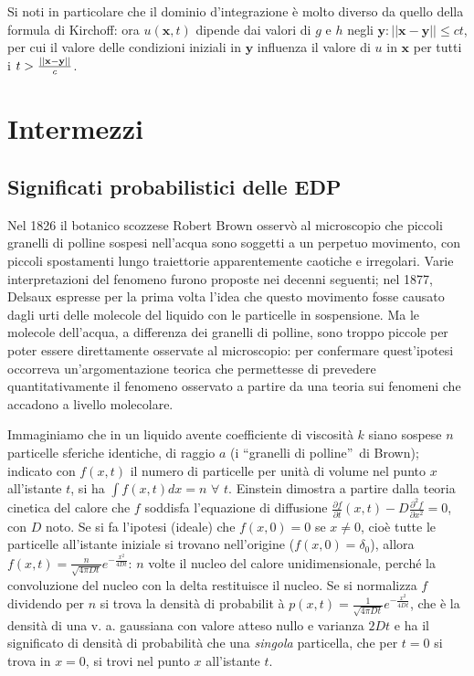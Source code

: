 \documentclass{article}
\begin{document}
Si noti in particolare che il dominio d'integrazione \`{e} molto diverso da
quello della formula di Kirchoff: ora $u\left( \mathbf{x},t\right) $ dipende
dai valori di $g$ e $h$ negli $\mathbf{y}:\left\vert \left\vert \mathbf{x-y}%
\right\vert \right\vert \leq ct$, per cui il valore delle condizioni
iniziali in $\mathbf{y}$ influenza il valore di $u$ in $\mathbf{x}$ per
tutti i $t>\frac{\left\vert \left\vert \mathbf{x-y}\right\vert \right\vert }{%
c}$.

\section{Intermezzi}

\subsection{Significati probabilistici delle EDP}

Nel 1826 il botanico scozzese Robert Brown osserv\`{o} al microscopio che
piccoli granelli di polline sospesi nell'acqua sono soggetti a un perpetuo
movimento, con piccoli spostamenti lungo traiettorie apparentemente caotiche
e irregolari. Varie interpretazioni del fenomeno furono proposte nei decenni
seguenti; nel 1877, Delsaux espresse per la prima volta l'idea che questo
movimento fosse causato dagli urti delle molecole del liquido con le
particelle in sospensione. Ma le molecole dell'acqua, a differenza dei
granelli di polline, sono troppo piccole per poter essere direttamente
osservate al microscopio: per confermare quest'ipotesi occorreva
un'argomentazione teorica che permettesse di prevedere quantitativamente il
fenomeno osservato a partire da una teoria sui fenomeni che accadono a
livello molecolare.

Immaginiamo che in un liquido avente coefficiente di viscosit\`{a} $k$ siano
sospese $n$ particelle sferiche identiche, di raggio $a$ (i
\textquotedblleft granelli di polline\textquotedblright\ di Brown); indicato
con $f(x,t)$ il numero di particelle per unit\`{a} di volume nel punto $x$
all'istante $t$, si ha $\int f\left( x,t\right) dx=n$ $\forall $ $t$.
Einstein dimostra a partire dalla teoria cinetica del calore che $f$
soddisfa l'equazione di diffusione $\frac{\partial f}{\partial t}\left(
x,t\right) -D\frac{\partial ^{2}f}{\partial x^{2}}=0$, con $D$ noto. Se si
fa l'ipotesi (ideale) che $f\left( x,0\right) =0$ se $x\neq 0$, cio\`{e}
tutte le particelle all'istante iniziale si trovano nell'origine ($f\left(
x,0\right) =\delta _{0}$), allora $f\left( x,t\right) =\frac{n}{\sqrt{4\pi Dt%
}}e^{-\frac{x^{2}}{4Dt}}$: $n$ volte il nucleo del calore unidimensionale,
perch\'{e} la convoluzione del nucleo con la delta restituisce il nucleo. Se
si normalizza $f$ dividendo per $n$ si trova la densit\`{a} di probabilit%
\`{a} $p\left( x,t\right) =\frac{1}{\sqrt{4\pi Dt}}e^{-\frac{x^{2}}{4Dt}}$,
che \`{e} la densit\`{a} di una v. a. gaussiana con valore atteso nullo e
varianza $2Dt$ e ha il significato di densit\`{a} di probabilit\`{a} che una 
\textit{singola} particella, che per $t=0$ si trova in $x=0$, si trovi nel
punto $x$ all'istante $t$.
\end{document}
